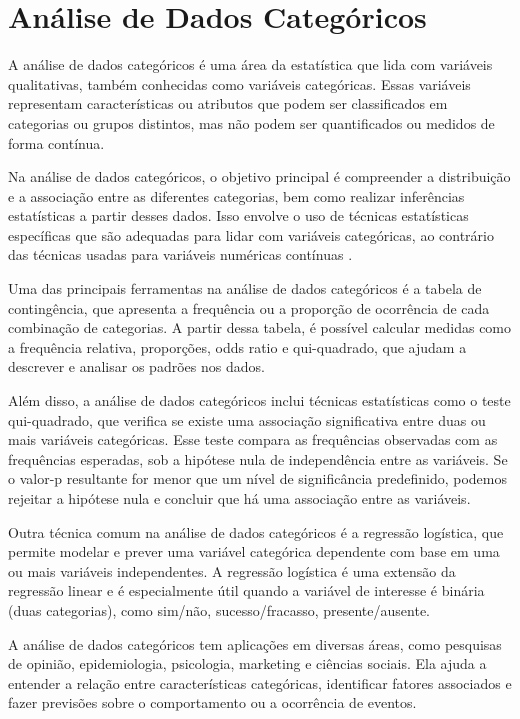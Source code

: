\chapter{Análise de Dados Categóricos}

A análise de dados categóricos é uma área da estatística que lida com variáveis qualitativas, também conhecidas como variáveis categóricas. Essas variáveis representam características ou atributos que podem ser classificados em categorias ou grupos distintos, mas não podem ser quantificados ou medidos de forma contínua.

Na análise de dados categóricos, o objetivo principal é compreender a distribuição e a associação entre as diferentes categorias, bem como realizar inferências estatísticas a partir desses dados. Isso envolve o uso de técnicas estatísticas específicas que são adequadas para lidar com variáveis categóricas, ao contrário das técnicas usadas para variáveis numéricas contínuas \parencite{Bussab2017}.

Uma das principais ferramentas na análise de dados categóricos é a tabela de contingência, que apresenta a frequência ou a proporção de ocorrência de cada combinação de categorias. A partir dessa tabela, é possível calcular medidas como a frequência relativa, proporções, odds ratio e qui-quadrado, que ajudam a descrever e analisar os padrões nos dados.

Além disso, a análise de dados categóricos inclui técnicas estatísticas como o teste qui-quadrado, que verifica se existe uma associação significativa entre duas ou mais variáveis categóricas. Esse teste compara as frequências observadas com as frequências esperadas, sob a hipótese nula de independência entre as variáveis. Se o valor-p resultante for menor que um nível de significância predefinido, podemos rejeitar a hipótese nula e concluir que há uma associação entre as variáveis.

Outra técnica comum na análise de dados categóricos é a regressão logística, que permite modelar e prever uma variável categórica dependente com base em uma ou mais variáveis independentes. A regressão logística é uma extensão da regressão linear e é especialmente útil quando a variável de interesse é binária (duas categorias), como sim/não, sucesso/fracasso, presente/ausente.

A análise de dados categóricos tem aplicações em diversas áreas, como pesquisas de opinião, epidemiologia, psicologia, marketing e ciências sociais. Ela ajuda a entender a relação entre características categóricas, identificar fatores associados e fazer previsões sobre o comportamento ou a ocorrência de eventos.